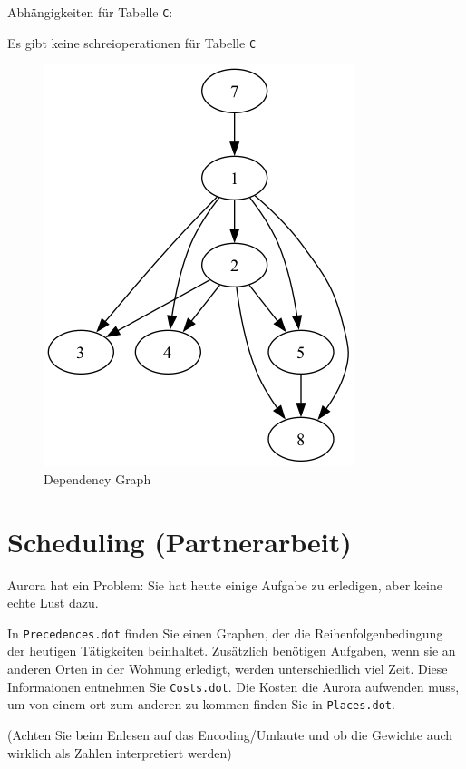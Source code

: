 \documentclass[a4paper,11pt]{report}
\begin{document}
    Abhängigkeiten für Tabelle \texttt{C}:

    Es gibt keine schreioperationen für Tabelle \texttt{C}

    \begin{figure}[htbp]
        \centering
        \includegraphics[height=0.4\textheight]{notebooks/assets/aufgabe_02/dependency_graph}
        \caption{Dependency Graph}
        \label{fig:a02_dependency_graph}
    \end{figure}

    \newpage

    \chapter{Scheduling (Partnerarbeit)}

    Aurora hat ein Problem: Sie hat heute einige Aufgabe zu erledigen, aber keine echte Lust dazu.

    In \texttt{Precedences.dot} finden Sie einen Graphen, der die Reihenfolgenbedingung der heutigen Tätigkeiten beinhaltet.
    Zusätzlich benötigen Aufgaben, wenn sie an anderen Orten in der Wohnung erledigt, werden unterschiedlich viel Zeit.
    Diese Informaionen entnehmen Sie \texttt{Costs.dot}.
    Die Kosten die Aurora aufwenden muss, um von einem ort zum anderen zu kommen finden Sie in \texttt{Places.dot}.

    (Achten Sie beim Enlesen auf das Encoding/Umlaute und ob die Gewichte auch wirklich als Zahlen interpretiert werden)
\end{document}
